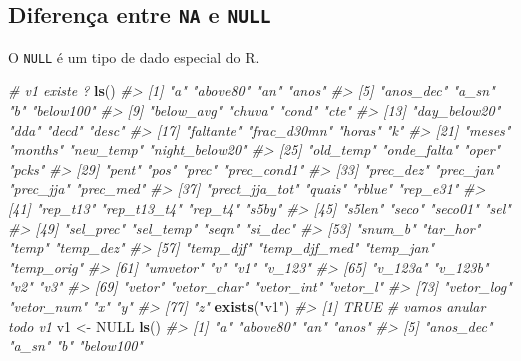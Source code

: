 \documentclass[]{book}
\newenvironment{Shaded}{\begin{snugshade}}{\end{snugshade}}
\newcommand{\KeywordTok}[1]{\textcolor[rgb]{0.13,0.29,0.53}{\textbf{#1}}}
\newcommand{\StringTok}[1]{\textcolor[rgb]{0.31,0.60,0.02}{#1}}
\newcommand{\CommentTok}[1]{\textcolor[rgb]{0.56,0.35,0.01}{\textit{#1}}}
\newcommand{\OtherTok}[1]{\textcolor[rgb]{0.56,0.35,0.01}{#1}}
\newcommand{\NormalTok}[1]{#1}
\begin{document}
\subsection{\texorpdfstring{Diferença entre \texttt{NA} e
\texttt{NULL}}{Diferença entre NA e NULL}}\label{diferenca-entre-na-e-null}

O \texttt{NULL} é um tipo de dado especial do R.

\begin{Shaded}
\begin{Highlighting}[]
\CommentTok{# v1 existe ?}
\KeywordTok{ls}\NormalTok{()}
\CommentTok{#>  [1] "a"             "above80"       "an"            "anos"         }
\CommentTok{#>  [5] "anos_dec"      "a_sn"          "b"             "below100"     }
\CommentTok{#>  [9] "below_avg"     "chuva"         "cond"          "cte"          }
\CommentTok{#> [13] "day_below20"   "dda"           "decd"          "desc"         }
\CommentTok{#> [17] "faltante"      "frac_d30mn"    "horas"         "k"            }
\CommentTok{#> [21] "meses"         "months"        "new_temp"      "night_below20"}
\CommentTok{#> [25] "old_temp"      "onde_falta"    "oper"          "pcks"         }
\CommentTok{#> [29] "pent"          "pos"           "prec"          "prec_cond1"   }
\CommentTok{#> [33] "prec_dez"      "prec_jan"      "prec_jja"      "prec_med"     }
\CommentTok{#> [37] "prect_jja_tot" "quais"         "rblue"         "rep_e31"      }
\CommentTok{#> [41] "rep_t13"       "rep_t13_t4"    "rep_t4"        "s5by"         }
\CommentTok{#> [45] "s5len"         "seco"          "seco01"        "sel"          }
\CommentTok{#> [49] "sel_prec"      "sel_temp"      "seqn"          "si_dec"       }
\CommentTok{#> [53] "snum_b"        "tar_hor"       "temp"          "temp_dez"     }
\CommentTok{#> [57] "temp_djf"      "temp_djf_med"  "temp_jan"      "temp_orig"    }
\CommentTok{#> [61] "umvetor"       "v"             "v1"            "v_123"        }
\CommentTok{#> [65] "v_123a"        "v_123b"        "v2"            "v3"           }
\CommentTok{#> [69] "vetor"         "vetor_char"    "vetor_int"     "vetor_l"      }
\CommentTok{#> [73] "vetor_log"     "vetor_num"     "x"             "y"            }
\CommentTok{#> [77] "z"}
\KeywordTok{exists}\NormalTok{(}\StringTok{"v1"}\NormalTok{)}
\CommentTok{#> [1] TRUE}
\CommentTok{# vamos anular todo v1}
\NormalTok{v1 <-}\StringTok{ }\OtherTok{NULL}
\KeywordTok{ls}\NormalTok{()}
\CommentTok{#>  [1] "a"             "above80"       "an"            "anos"         }
\CommentTok{#>  [5] "anos_dec"      "a_sn"          "b"             "below100"     }

\end{Highlighting}
\end{Shaded}
\end{document}
